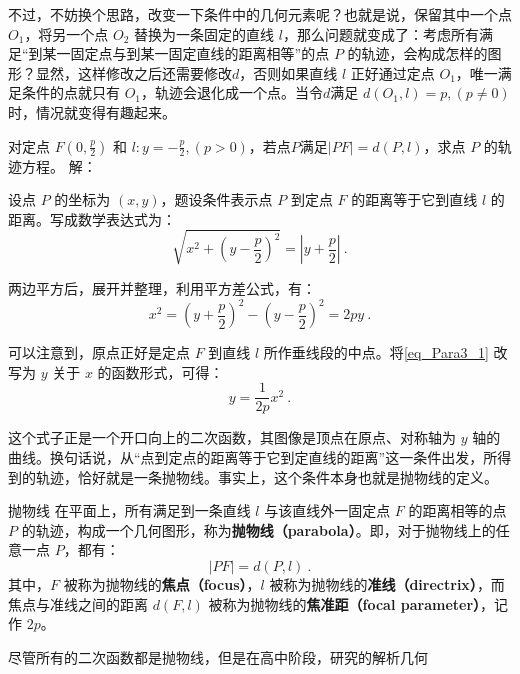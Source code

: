 不过，不妨换个思路，改变一下条件中的几何元素呢？也就是说，保留其中一个点 $O_1$，将另一个点 $O_2$ 替换为一条固定的直线 $l$，那么问题就变成了：考虑所有满足“到某一固定点与到某一固定直线的距离相等”的点 $P$ 的轨迹，会构成怎样的图形？显然，这样修改之后还需要修改$d$，否则如果直线 $l$ 正好通过定点 $O_1$，唯一满足条件的点就只有 $O_1$，轨迹会退化成一个点。当令$d$满足 $d(O_1,l)=p,(p\neq0)$时，情况就变得有趣起来。

\begin{example}{对定点 $F\left(0, \displaystyle\frac{p}{2}\right)$ 和 $l:y=-\displaystyle\frac{p}{2},\left(p>0\right)$，若点$P$满足$|PF|=d(P,l)$，求点 $P$ 的轨迹方程。}
解：

设点 $P$ 的坐标为 $(x, y)$，题设条件表示点 $P$ 到定点 $F$ 的距离等于它到直线 $l$ 的距离。写成数学表达式为：
\begin{equation}
\sqrt{x^2 + \left(y - \frac{p}{2}\right)^2} = \left|y + \frac{p}{2}\right|~.
\end{equation}

两边平方后，展开并整理，利用平方差公式，有：
\begin{equation}\label{eq_Para3_1}
x^2 = \left(y + \frac{p}{2}\right)^2 - \left(y - \frac{p}{2}\right)^2 = 2py~.
\end{equation}
\end{example}

可以注意到，原点正好是定点 $F$ 到直线 $l$ 所作垂线段的中点。将\autoref{eq_Para3_1} 改写为 $y$ 关于 $x$ 的函数形式，可得：
\begin{equation}
y = \frac{1}{2p}x^2~.
\end{equation}

这个式子正是一个开口向上的二次函数，其图像是顶点在原点、对称轴为 $y$ 轴的曲线。换句话说，从“点到定点的距离等于它到定直线的距离”这一条件出发，所得到的轨迹，恰好就是一条抛物线。事实上，这个条件本身也就是抛物线的定义。

\begin{definition}{抛物线}
在平面上，所有满足到一条直线 $l$ 与该直线外一固定点 $F$ 的距离相等的点 $P$ 的轨迹，构成一个几何图形，称为\textbf{抛物线（parabola）}。即，对于抛物线上的任意一点 $P$，都有：
\begin{equation}
|PF| = d(P, l)~.
\end{equation}
其中，$F$ 被称为抛物线的\textbf{焦点（focus）}，$l$ 被称为抛物线的\textbf{准线（directrix）}，而焦点与准线之间的距离 $d(F, l)$ 被称为抛物线的\textbf{焦准距（focal parameter）}，记作 $2p$。
\end{definition}

尽管所有的二次函数都是抛物线，但是在高中阶段，研究的解析几何

